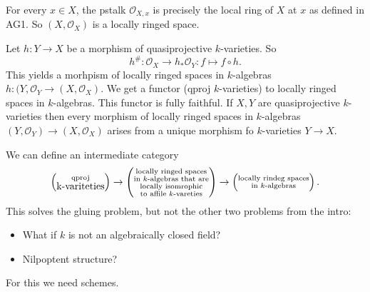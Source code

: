 For every $x \in X$, the pstalk $\mathcal{O} _{X, x}$ is precisely the local ring of $X$ at $x$ as defined in AG1. So $(X, \mathcal{O} _X) $ is a locally ringed space. 
 
Let $h: Y \to X$ be a morphism of quasiprojective $k$-varieties. So \[
	h^\#: \mathcal{O} _X \to h_* \mathcal{O} _Y: f\mapsto  f \circ h
.\] 
This yields a morhpism of locally ringed spaces in $k$-algebras $h:(Y, \mathcal{O} _Y \to (X, \mathcal{O} _X)$. 
We get a functor (qproj $k$-varieties) to locally ringed spaces in $k$-algebras. 
This functor is fully faithful.
If $X, Y$ are quasiprojective $k$-varieties then every morphism of locally ringed spaces in $k$-algebras $(Y, \mathcal{O} _Y) \to (X, \mathcal{O} _X)$ arises from a unique morphism fo $k$-varieties $Y \to X$.

We can define an intermediate category \[
	\left( \substack{\text{qproj}\\$k$ \text{-variteties}} \right) \to \left( \substack{\text{locally ringed spaces} \\ \text{in $k$-algebras that are} \\ \text{locally isomrophic} \\ \text{to affile $k$-vareties}} \right) \to  \left( \substack{\text{locally rindeg spaces} \\ \text{in $k$-algebras} } \right) 
.\] 
This solves the gluing problem, but not the other two problems from the intro:
\begin{itemize}
	\item What if $k$ is not an algebraically closed field?
	\item Nilpoptent structure?
\end{itemize}
For this we need schemes.


